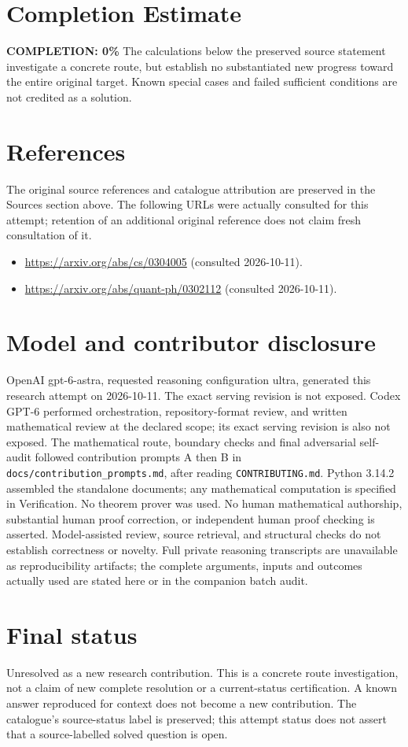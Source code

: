 \documentclass[11pt]{article}
\begin{document}
\section{Completion Estimate}
\noindent\textbf{COMPLETION: 0\%}
The calculations below the preserved source statement investigate a concrete route,
but establish no substantiated new progress toward the entire original target.
Known special cases and failed sufficient conditions are not credited as a solution.
\section{References}
The original source references and catalogue attribution are preserved in the
Sources section above. The following URLs were actually consulted for this attempt;
retention of an additional original reference does not claim fresh consultation of it.
\begin{itemize}
\item \url{https://arxiv.org/abs/cs/0304005} (consulted 2026-10-11). 
\item \url{https://arxiv.org/abs/quant-ph/0302112} (consulted 2026-10-11). 
\end{itemize}
\section{Model and contributor disclosure}
OpenAI gpt-6-astra, requested reasoning configuration ultra, generated this research
attempt on 2026-10-11. The exact serving revision is not exposed. Codex GPT-6
performed orchestration, repository-format review, and written mathematical review at the declared scope; its exact serving revision
is also not exposed. The mathematical route, boundary checks and final adversarial
self-audit followed contribution prompts A then B in
\texttt{docs/contribution\_prompts.md}, after reading \texttt{CONTRIBUTING.md}.
Python 3.14.2 assembled the standalone documents; any mathematical computation is
specified in Verification. No theorem prover was used. No human mathematical
authorship, substantial human proof correction, or independent human proof checking
is asserted. Model-assisted review, source retrieval, and structural checks do not
establish correctness or novelty. Full private reasoning transcripts are unavailable
as reproducibility artifacts; the complete arguments, inputs and outcomes actually
used are stated here or in the companion batch audit.
\section{Final status}
Unresolved as a new research contribution. This is a concrete route investigation,
not a claim of new complete resolution or a current-status certification. A known
answer reproduced for context does not become a new contribution. The catalogue's
source-status label is preserved; this attempt status does not assert that a
source-labelled solved question is open.
\end{document}
